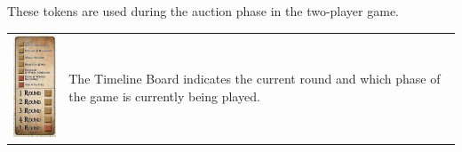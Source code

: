 \documentclass[10pt,twocolumn]{article}
\begin{document}
These tokens are used during the auction phase in the two-player game. \iftoggle{original-rules}{The red tokens feature Genghis Khan while the Blue tokens feature Rommel.}{They are also used during the Negotiation step of the myPhase{Negotiation \& War} phase. One token features Genghis Khan and the other features Rommel. Both tiles have a Red side, with the number 1, and a Blue side with the number 2.}
\begin{tabular}{p{2cm} p{5cm}}
	\vspace{0pt}
	\includegraphics[width=2cm]{TimelineBoard}
	&
	\vspace{0pt}
The Timeline Board indicates the current round and which phase of the game is currently being played.
\end{tabular}
\end{document}

